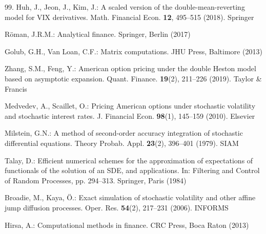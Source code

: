\begin{thebibliography}{99.}
 Huh, J., Jeon, J., Kim, J.: A scaled version of the double-mean-reverting model for VIX derivatives. Math. Financial Econ. \textbf{12}, 495--515 (2018). Springer

 Röman, J.R.M.: Analytical finance. Springer, Berlin (2017)

 Golub, G.H., Van Loan, C.F.: Matrix computations. JHU Press, Baltimore (2013)

 Zhang, S.M., Feng, Y.: American option pricing under the double Heston model based on asymptotic expansion. Quant. Finance. \textbf{19}(2), 211--226 (2019). Taylor \& Francis

 Medvedev, A., Scaillet, O.: Pricing American options under stochastic volatility and stochastic interest rates. J. Financial Econ. \textbf{98}(1), 145--159 (2010). Elsevier

 Milstein, G.N.: A method of second-order accuracy integration of stochastic differential equations. Theory Probab. Appl. \textbf{23}(2), 396--401 (1979). SIAM

 Talay, D.: Efficient numerical schemes for the approximation of expectations of functionals of the solution of an SDE, and applications. In: Filtering and Control of Random Processes, pp. 294--313. Springer, Paris (1984)

 Broadie, M., Kaya, Ö.: Exact simulation of stochastic volatility and other affine jump diffusion processes. Oper. Res. \textbf{54}(2), 217--231 (2006). INFORMS

 Hirsa, A.: Computational methods in finance. CRC Press, Boca Raton (2013)
\end{thebibliography}

